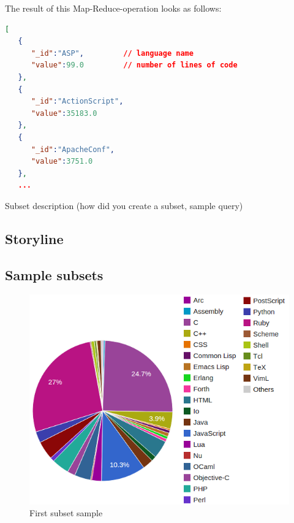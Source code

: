 The result of this Map-Reduce-operation looks as follows:

\begin{lstlisting}[language=json]
[  
   {  
      "_id":"ASP",         // language name
      "value":99.0         // number of lines of code
   },
   {  
      "_id":"ActionScript",
      "value":35183.0
   },
   {  
      "_id":"ApacheConf",
      "value":3751.0
   },
   ...
\end{lstlisting}

Subset description (how did you create a subset, sample query)

\subsection{Storyline}\label{sec:storyline}


\subsection{Sample subsets}\label{sec:sample-subsets}

\begin{figure}[h]
    \centering
    \includegraphics[width=0.8\linewidth]{images/sample1.png}
    \caption{First subset sample}
    \label{fig:sample1}
\end{figure}

